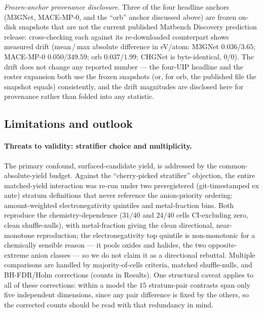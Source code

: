 \documentclass[aip,jcp,preprint,superscriptaddress,amsmath,amssymb]{revtex4-2}
\begin{document}
\emph{Frozen-anchor provenance disclosure.} Three of the four headline anchors (M3GNet, MACE-MP-0,
and the ``orb'' anchor discussed above) are frozen on-disk snapshots that are not the
current published Matbench Discovery prediction release: cross-checking each against its re-downloaded counterpart
shows measured drift (mean\,/\,max absolute difference in eV/atom: M3GNet $0.036$/$3.65$;
MACE-MP-0 $0.050$/$349.59$; orb $0.037$/$1.99$; CHGNet is byte-identical, $0$/$0$). The drift does
not change any reported number --- the four-UIP headline and the roster expansion both use the
frozen snapshots (or, for orb, the published file the snapshot equals) consistently, and the drift
magnitudes are disclosed here for provenance rather than folded into any statistic.



\subsection{Limitations and outlook}

\paragraph{Threats to validity: stratifier choice and multiplicity.} The primary confound,
surfaced-candidate yield, is addressed by the common-absolute-yield budget. Against the
``cherry-picked stratifier'' objection, the entire matched-yield interaction was re-run under
two preregistered (git-timestamped ex ante) stratum definitions that never reference the
anion-priority ordering: amount-weighted electronegativity quintiles and metal-fraction bins.
Both reproduce the chemistry-dependence ($31/40$ and $24/40$ cells CI-excluding zero, clean
shuffle-nulls), with metal-fraction giving the clean directional, near-monotone reproduction;
the electronegativity top quintile is non-monotonic for a chemically sensible reason --- it
pools oxides and halides, the two opposite-extreme anion classes --- so we do not claim it as
a directional rebuttal. Multiple comparisons are handled by majority-of-cells criteria,
matched shuffle-nulls, and BH-FDR/Holm corrections (counts in Results). One structural
caveat applies to all of these corrections: within a model the $15$ stratum-pair contrasts
span only five independent dimensions, since any pair difference is fixed by the others, so
the corrected counts should be read with that redundancy in mind.
\end{document}
